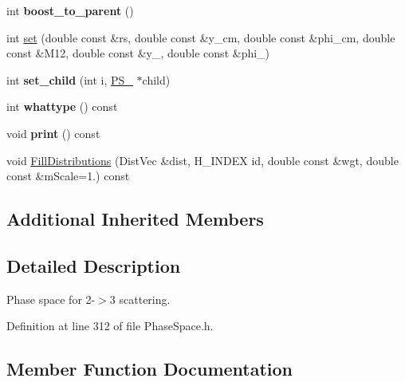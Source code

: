 \begin{DoxyCompactItemize}
\item 
\hypertarget{classPS__2__3_ad6c103ccf419ec6f416c54866d305fd0}{}int {\bfseries boost\+\_\+to\+\_\+parent} ()\label{classPS__2__3_ad6c103ccf419ec6f416c54866d305fd0}

\item 
int \hyperlink{classPS__2__3_a278af8edd62fe80330a5dc5f2d385bf5}{set} (double const \&rs, double const \&y\+\_\+cm, double const \&phi\+\_\+cm, double const \&M12, double const \&y\+\_, double const \&phi\+\_)
\item 
\hypertarget{classPS__2__3_a2da075a0d45b58fd9b4b50f6185a7368}{}int {\bfseries set\+\_\+child} (int i, \hyperlink{classPS__2}{P\+S\+\_} $\ast$child)\label{classPS__2__3_a2da075a0d45b58fd9b4b50f6185a7368}

\item 
\hypertarget{classPS__2__3_ab7105d8734ec97b22c0104bd451d619b}{}int {\bfseries whattype} () const \label{classPS__2__3_ab7105d8734ec97b22c0104bd451d619b}

\item 
\hypertarget{classPS__2__3_a98b7559fbc72002c2dd6dadb1db9be0b}{}void {\bfseries print} () const \label{classPS__2__3_a98b7559fbc72002c2dd6dadb1db9be0b}

\item 
void \hyperlink{classPS__2__3_a2b4d8bb79778e6281a3e53e2118a4d1c}{Fill\+Distributions} (Dist\+Vec \&dist, H\+\_\+\+I\+N\+D\+E\+X id, double const \&wgt, double const \&m\+Scale=1.) const 
\end{DoxyCompactItemize}
\subsection*{Additional Inherited Members}


\subsection{Detailed Description}
Phase space for 2-\/$>$3 scattering. 

Definition at line 312 of file Phase\+Space.\+h.



\subsection{Member Function Documentation}
\hypertarget{classPS__2__3_a2b4d8bb79778e6281a3e53e2118a4d1c}{}

